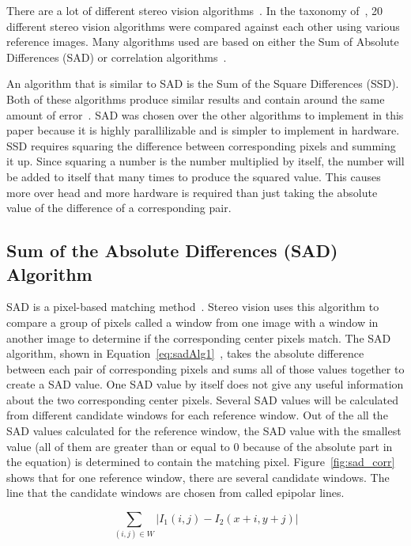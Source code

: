 There are a lot of different stereo vision algorithms~\cite{taxonomy}. In the taxonomy of~\cite{taxonomy}, 20 different stereo vision algorithms were compared against each other using various reference images. Many algorithms used are based on either the Sum of Absolute Differences (SAD) or correlation algorithms~\cite{alteraStratixIVPaper}.

An algorithm that is similar to SAD is the Sum of the Square Differences (SSD). Both of these algorithms produce similar results and contain around the same amount of error~\cite{xilinxSpartan3ABoard}. SAD was chosen over the other algorithms to implement in this paper because it is highly parallilizable and is simpler to implement in hardware. SSD requires squaring the difference between corresponding pixels and summing it up. Since squaring a number is the number multiplied by itself, the number will be added to itself that many times to produce the squared value. This causes more over head and more hardware is required than just taking the absolute value of the difference of a corresponding pair.

\subsection{Sum of the Absolute Differences (SAD) Algorithm}

SAD is a pixel-based matching method~\cite{alteraStratixIVPaper}. Stereo vision uses this algorithm to compare a group of pixels called a window from one image with a window in another image to determine if the corresponding center pixels match. The SAD algorithm, shown in Equation~\ref{eq:sadAlg1}~\cite{alteraStratixIVPaper}, takes the absolute difference between each pair of corresponding pixels and sums all of those values together to create a SAD value. One SAD value by itself does not give any useful information about the two corresponding center pixels. Several SAD values will be calculated from different candidate windows for each reference window. Out of the all the SAD values calculated for the reference window, the SAD value with the smallest value (all of them are greater than or equal to 0 because of the absolute part in the equation) is determined to contain the matching pixel. Figure~\ref{fig:sad_corr} shows that for one reference window, there are several candidate windows. The line that the candidate windows are chosen from called epipolar lines. 

\begin{equation}
	\sum\limits_{(i,j)\in W}\left| I_{1}(i,j)-I_{2}(x+i,y+j) \right|
	\label{eq:sadAlg1}
\end{equation}

